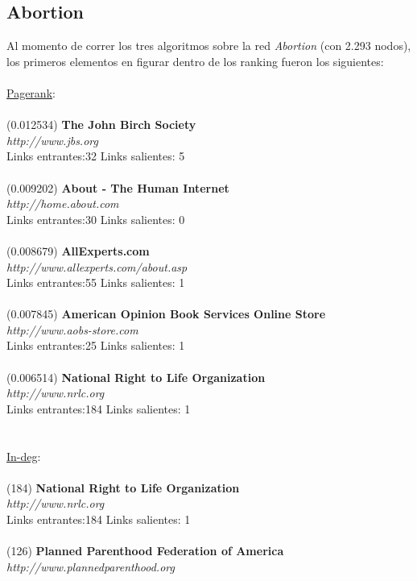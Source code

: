 \documentclass[a4paper]{article}
\begin{document}
\subsection*{Abortion}
\indent Al momento de correr los tres algoritmos sobre la red \emph{Abortion} (con 2.293 nodos), los primeros elementos en figurar dentro de los ranking fueron los siguientes: \\
\\
\underline{Pagerank}: \\
\\
(0.012534) \textbf{The John Birch Society} \\
\textit{http://www.jbs.org} \\
Links entrantes:32 \indent Links salientes: 5\\
\\
(0.009202) \textbf{About - The Human Internet} \\
\textit{http://home.about.com} \\
Links entrantes:30 \indent Links salientes: 0\\
\\
(0.008679)\textbf{ AllExperts.com }\\
\textit{http://www.allexperts.com/about.asp} \\
Links entrantes:55 \indent Links salientes: 1\\
\\
(0.007845) \textbf{American Opinion Book Services Online Store }\\
\textit{http://www.aobs-store.com} \\
Links entrantes:25 \indent Links salientes: 1\\
\\
(0.006514) \textbf{National Right to Life Organization} \\
\textit{http://www.nrlc.org} \\
Links entrantes:184 \indent Links salientes: 1\\
\\
\\
\underline{In-deg}:\\
\\
(184) \textbf{National Right to Life Organization} \\
\textit{http://www.nrlc.org} \\
Links entrantes:184 \indent Links salientes: 1\\
\\
(126) \textbf{Planned Parenthood Federation of America} \\
\textit{http://www.plannedparenthood.org} \\
\end{document}
